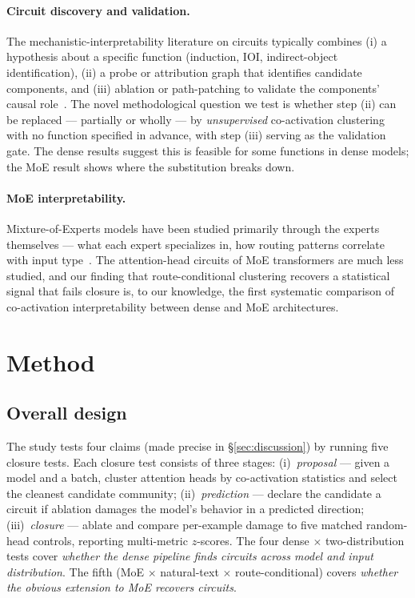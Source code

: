 \documentclass[11pt]{article}
\begin{document}
\paragraph{Circuit discovery and validation.}
The mechanistic-interpretability literature on circuits typically combines
(i) a hypothesis about a specific function (induction, IOI, indirect-object
identification), (ii) a probe or attribution graph that identifies candidate
components, and (iii) ablation or path-patching to validate the components'
causal role~\cite{olsson2022, wang2023ioi, conmy2023}. The novel methodological
question we test is whether step (ii) can be replaced --- partially or
wholly --- by \emph{unsupervised} co-activation clustering with no function
specified in advance, with step (iii) serving as the validation gate. The
dense results suggest this is feasible for some functions in dense models;
the MoE result shows where the substitution breaks down.

\paragraph{MoE interpretability.}
Mixture-of-Experts models have been studied primarily through the experts
themselves --- what each expert specializes in, how routing patterns
correlate with input type~\cite{zoph2022}. The attention-head circuits of
MoE transformers are much less studied, and our finding that
route-conditional clustering recovers a statistical signal that fails
closure is, to our knowledge, the first systematic comparison of
co-activation interpretability between dense and MoE architectures.

\section{Method}
\label{sec:method}

\subsection{Overall design}
The study tests four claims (made precise in \S\ref{sec:discussion}) by
running five closure tests. Each closure test consists of three stages:
(i)~\emph{proposal} --- given a model and a batch, cluster attention heads
by co-activation statistics and select the cleanest candidate community;
(ii)~\emph{prediction} --- declare the candidate a circuit if ablation
damages the model's behavior in a predicted direction; (iii)~\emph{closure}
--- ablate and compare per-example damage to five matched random-head
controls, reporting multi-metric $z$-scores. The four dense $\times$
two-distribution tests cover \emph{whether the dense pipeline finds
circuits across model and input distribution}. The fifth (MoE $\times$
natural-text $\times$ route-conditional) covers \emph{whether the obvious
extension to MoE recovers circuits}.
\end{document}
